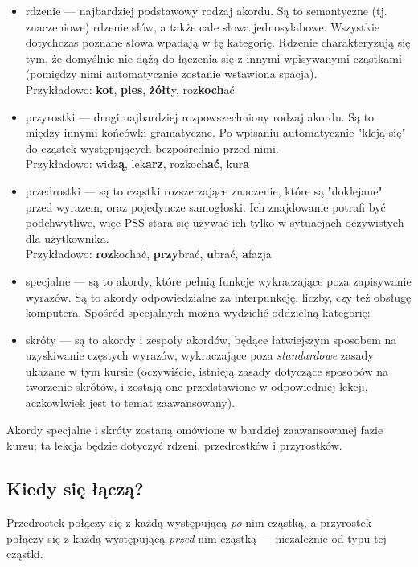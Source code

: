 \documentclass[12p, oneside]{book}
\begin{document}
\begin{itemize}
	\item rdzenie --- najbardziej podstawowy rodzaj akordu. Są to semantyczne (tj. znaczeniowe) rdzenie słów, a także całe słowa jednosylabowe. Wszystkie dotychczas poznane słowa wpadają w tę kategorię. Rdzenie charakteryzują się tym, że domyślnie nie dążą do łączenia się z innymi wpisywanymi cząstkami (pomiędzy nimi automatycznie zostanie wstawiona spacja).  \\
	Przykładowo: \textbf{kot}, \textbf{pies}, \textbf{żółt}y, roz\textbf{koch}ać 
	\item przyrostki --- drugi najbardziej rozpowszechniony rodzaj akordu. Są to między innymi końcówki gramatyczne. Po wpisaniu automatycznie "kleją się" do cząstek występujących bezpośrednio przed nimi. \\
	Przykładowo: widz\textbf{ą}, lek\textbf{arz}, rozkoch\textbf{ać}, kur\textbf{a}
	\item przedrostki --- są to cząstki rozszerzające znaczenie, które są "doklejane" przed wyrazem, oraz pojedyncze samogłoski. Ich znajdowanie potrafi być podchwytliwe, więc PSS stara się używać ich tylko w sytuacjach oczywistych dla użytkownika. \\
	Przykładowo: \textbf{roz}kochać, \textbf{przy}brać, \textbf{u}brać, \textbf{a}fazja
	\item specjalne --- są to akordy, które pełnią funkcje wykraczające poza zapisywanie wyrazów. Są to akordy odpowiedzialne za interpunkcję, liczby, czy też obsługę komputera. Spośród specjalnych można wydzielić oddzielną kategorię:
	\item skróty --- są to akordy i zespoły akordów, będące łatwiejszym sposobem na uzyskiwanie częstych wyrazów, wykraczające poza \emph{standardowe} zasady ukazane w tym kursie (oczywiście, istnieją zasady dotyczące sposobów na tworzenie skrótów, i zostają one przedstawione w odpowiedniej lekcji, aczkowlwiek jest to temat zaawansowany).
\end{itemize}

Akordy specjalne i skróty zostaną omówione w bardziej zaawansowanej fazie kursu; ta lekcja będzie dotyczyć rdzeni, przedrostków i przyrostków.

\subsection*{Kiedy się łączą?}

Przedrostek połączy się z każdą występującą \emph{po} nim cząstką, a przyrostek połączy się z każdą występującą \emph{przed} nim cząstką --- niezależnie od typu tej cząstki.
\end{document}
